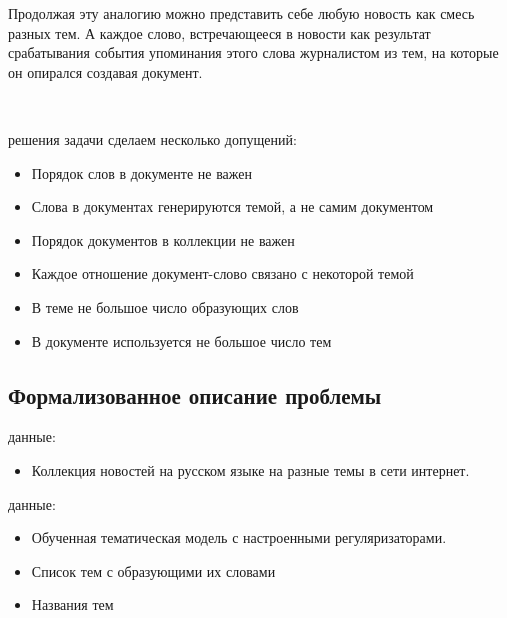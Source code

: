 Продолжая эту аналогию можно представить себе любую новость как смесь разных тем. А каждое слово, встречающееся в новости как результат срабатывания события упоминания этого слова журналистом из тем, на которые он опирался создавая документ.

~\

 решения задачи сделаем несколько допущений:

\begin{itemize}
    \item Порядок слов в документе не важен
    \item Слова в документах генерируются темой, а не самим документом
    \item Порядок документов в коллекции не важен
    \item Каждое отношение документ-слово связано с некоторой темой 
    \item В теме не большое число образующих слов
    \item В документе используется не большое число тем
\end{itemize}

\subsection{Формализованное описание проблемы}

 данные:

\begin{itemize}
    \item Коллекция новостей на русском языке на разные темы в сети интернет.
\end{itemize}

 данные:

\begin{itemize}
    \item Обученная тематическая модель с настроенными регуляризаторами.
    \item Список тем с образующими их словами
    \item \todo{}Названия тем
\end{itemize}

%
